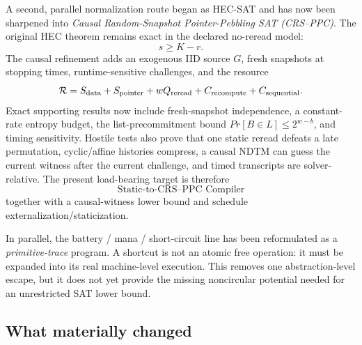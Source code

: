 \documentclass[11pt]{article}
\begin{document}
A second, parallel normalization route began as HEC-SAT and has now been sharpened into
\emph{Causal Random-Snapshot Pointer-Pebbling SAT (CRS--PPC)}. The original HEC theorem remains
exact in the declared no-reread model:
\[
\boxed{s\ge K-r.}
\]
The causal refinement adds an exogenous IID source \(G\), fresh snapshots at stopping times,
runtime-sensitive challenges, and the resource
\[
\mathcal R=S_{\rm data}+S_{\rm pointer}+wQ_{\rm reread}+C_{\rm recompute}+C_{\rm sequential}.
\]
Exact supporting results now include fresh-snapshot independence, a constant-rate entropy budget,
the list-precommitment bound \(Pr[B\in L]\le2^{w-b}\), and timing sensitivity. Hostile
tests also prove that one static reread defeats a late permutation, cyclic/affine histories
compress, a causal NDTM can guess the current witness after the current challenge, and timed
transcripts are solver-relative. The present load-bearing target is therefore
\[
\boxed{\text{Static-to-CRS--PPC Compiler}}
\]
together with a causal-witness lower bound and schedule externalization/staticization.

In parallel, the battery / mana / short-circuit line has been reformulated as a
\emph{primitive-trace} program. A shortcut is not an atomic free operation: it must be expanded into
its real machine-level execution. This removes one abstraction-level escape, but it does not yet
provide the missing noncircular potential needed for an unrestricted SAT lower bound.

\subsection{What materially changed}
\end{document}
